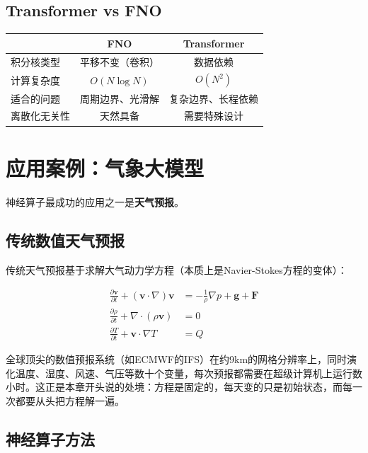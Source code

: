 \subsection{Transformer vs FNO}

\begin{center}
\begin{tabular}{l|cc}
\toprule
& \textbf{FNO} & \textbf{Transformer} \\
\midrule
积分核类型 & 平移不变（卷积） & 数据依赖 \\
计算复杂度 & $O(N \log N)$ & $O(N^2)$ \\
适合的问题 & 周期边界、光滑解 & 复杂边界、长程依赖 \\
离散化无关性 & 天然具备 & 需要特殊设计 \\
\bottomrule
\end{tabular}
\end{center}

\section{应用案例：气象大模型}
\label{sec:weather}

神经算子最成功的应用之一是\textbf{天气预报}。

\subsection{传统数值天气预报}

传统天气预报基于求解大气动力学方程（本质上是Navier-Stokes方程的变体）：

\begin{align}
    \frac{\partial \mathbf{v}}{\partial t} + (\mathbf{v} \cdot \nabla)\mathbf{v} &= -\frac{1}{\rho}\nabla p + \mathbf{g} + \mathbf{F} \\
    \frac{\partial \rho}{\partial t} + \nabla \cdot (\rho \mathbf{v}) &= 0 \\
    \frac{\partial T}{\partial t} + \mathbf{v} \cdot \nabla T &= Q
\end{align}

全球顶尖的数值预报系统（如ECMWF的IFS）在约9km的网格分辨率上，同时演化温度、湿度、风速、气压等数十个变量，每次预报都需要在超级计算机上运行数小时。这正是本章开头说的处境：方程是固定的，每天变的只是初始状态，而每一次都要从头把方程解一遍。

\subsection{神经算子方法}

